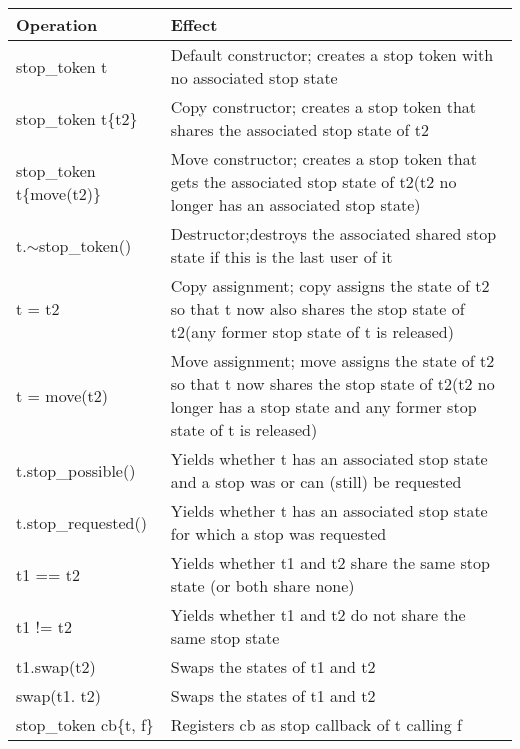 \begin{longtable}[c]{|l|l|}
\hline
\textbf{Operation}     & \textbf{Effect}                                                                          \\ \hline
\endfirsthead
%
\endhead
%
stop\_token t          & Default constructor; creates a stop token with no associated stop state                  \\ \hline
stop\_token t\{t2\}    & Copy constructor; creates a stop token that shares the associated stop state of t2       \\ \hline
stop\_token t\{move(t2)\} &
Move constructor; creates a stop token that gets the associated stop state of t2(t2 no longer has an associated stop state) \\ \hline
t.$\sim$stop\_token()  & Destructor;destroys the associated shared stop state if this is the last user of it      \\ \hline
t = t2 &
Copy assignment; copy assigns the state of t2 so that t now also shares the stop state of t2(any former stop state of t is released) \\ \hline
t = move(t2) &
Move assignment; move assigns the state of t2 so that t now shares the stop state of t2(t2 no longer has a stop state and any former stop state of t is released) \\ \hline
t.stop\_possible()     & Yields whether t has an associated stop state and a stop was or can (still) be requested \\ \hline
t.stop\_requested()    & Yields whether t has an associated stop state for which a stop was requested             \\ \hline
t1 == t2               & Yields whether t1 and t2 share the same stop state (or both share none)                  \\ \hline
t1 != t2               & Yields whether t1 and t2 do not share the same stop state                                \\ \hline
t1.swap(t2)            & Swaps the states of t1 and t2                                                            \\ \hline
swap(t1. t2)           & Swaps the states of t1 and t2                                                            \\ \hline
stop\_token cb\{t, f\} & Registers cb as stop callback of t calling f                                             \\ \hline
\end{longtable}

